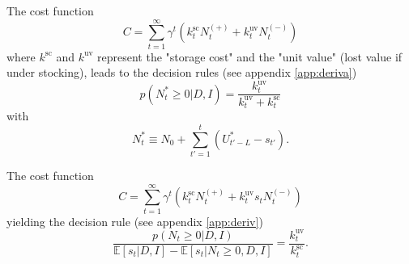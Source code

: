 \begin{example}
	The cost function
	\begin{equation}
		C = \sum_{t=1}^{\infty}\gamma^{t}(k^\text{sc}_{t}N_{t}^{(+)}+k_{t}^\text{uv}N_{t}^{(-)})
	\end{equation}
	where $k^\text{sc}$ and $k^\text{uv}$ represent the "storage cost" and the "unit value" (lost value if under stocking), leads to the decision rules (see appendix \ref{app:deriva})
	\begin{equation}
		p(N_t^*\geq 0|D,I)=\frac{k_{t}^\text{uv}}{k_{t}^\text{uv}+k^\text{sc}_{t}}
		\label{eq:crit1}
	\end{equation}
	with
	\begin{equation}
		N_t^*\equiv N_0+\sum_{t'=1}^{t}(U_{t'-L}^*-s_{t'}).
	\end{equation}
\end{example}


\begin{example}
	The cost function
	\begin{equation}
		C = \sum_{t=1}^{\infty}\gamma^{t}(k^\text{sc}_{t}N_{t}^{(+)}+k_{t}^\text{uv}s_{t}N_{t}^{(-)})
	\end{equation}
	yielding the decision rule (see appendix \ref{app:deriv})
	\begin{equation}
		\frac{p(N_t\geq 0|D,I)}{\mathbb{E}[s_t|D,I]-\mathbb{E}[s_t|N_{t}\geq 0,D,I]}=\frac{k_{t}^\text{uv}}{k^\text{sc}_{t}}.
		\label{eq:crit2}
	\end{equation}
\end{example}






